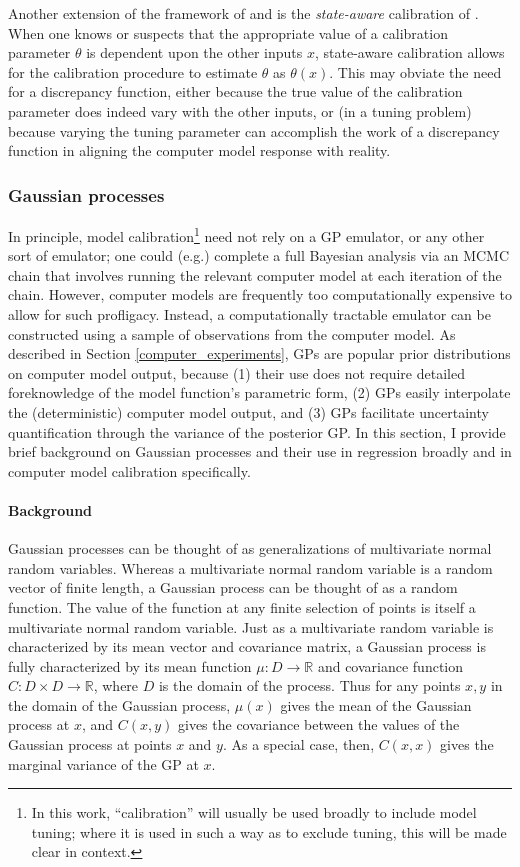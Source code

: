 \documentclass{article}
\begin{document}
Another extension of the framework of \cite{Kennedy2001} and \cite{Bayarri2007} is the \emph{state-aware} calibration of \cite{Brown2016}. When one knows or suspects that the appropriate value of a calibration parameter $\theta$ is dependent upon the other inputs $x$, state-aware calibration allows for the calibration procedure to estimate $\theta$ as $\theta(x)$. This may obviate the need for a discrepancy function, either because the true value of the calibration parameter does indeed vary with the other inputs, or (in a tuning problem) because varying the tuning parameter can accomplish the work of a discrepancy function in aligning the computer model response with reality.

\subsubsection{Gaussian processes} \label{gaussian_processes}

In principle, model calibration\footnote{In this work, ``calibration'' will usually be used broadly to include model tuning; where it is used in such a way as to exclude tuning, this will be made clear in context.}
need not rely on a GP emulator, or any other sort of emulator; one could (e.g.) complete a full Bayesian analysis via an MCMC chain that involves running the relevant computer model at each iteration of the chain. However, computer models are frequently too computationally expensive to allow for such profligacy. Instead, a computationally tractable emulator can be constructed using a sample of observations from the computer model. As described in Section \ref{computer_experiments}, GPs are popular prior distributions on computer model output, because (1) their use does not require detailed foreknowledge of the model function's parametric form, (2) GPs easily interpolate the (deterministic) computer model output, and (3) GPs facilitate uncertainty quantification through the variance of the posterior GP. In this section, I provide brief background on Gaussian processes and their use in regression broadly and in computer model calibration specifically.

\paragraph{Background}

Gaussian processes can be thought of as generalizations of multivariate normal random variables. Whereas a multivariate normal random variable is a random vector of finite length, a Gaussian process can be thought of as a random function. The value of the function at any finite selection of points is itself a multivariate normal random variable. Just as a multivariate random variable is characterized by its mean vector and covariance matrix, a Gaussian process is fully characterized by its mean function $\mu:D\to \mathbb R$ and covariance function $C:D\times D\to \mathbb R$, where $D$ is the domain of the process. Thus for any points $x,y$ in the domain of the Gaussian process, $\mu(x)$ gives the mean of the Gaussian process at $x$, and $C(x,y)$ gives the covariance between the values of the Gaussian process at points $x$ and $y$. As a special case, then, $C(x,x)$ gives the marginal variance of the GP at $x$. 
\end{document}
